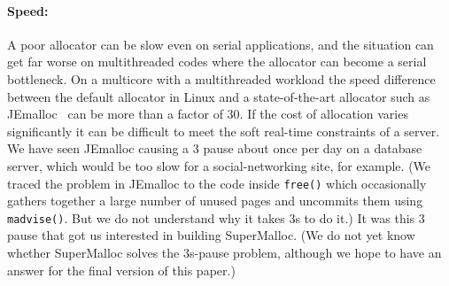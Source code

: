\documentclass[pldi]{sigplanconf-pldi15}
\newcommand{\code}[1]{\texttt{#1}}
\begin{document}
{\paragraph{Speed:}} A poor allocator can be slow even on serial
applications, and the situation can get far worse on multithreaded
codes where the allocator can become a serial bottleneck.  On a
multicore with a multithreaded workload the speed difference between
the default allocator in Linux \cite{Lea96} and a state-of-the-art
allocator such as JEmalloc~\cite{Evans06} can be more than a factor of
30.  If the cost of allocation varies significantly it can be
difficult to meet the soft real-time constraints of a server.  We have
seen JEmalloc causing a \unit{3}\second{} pause about once per day on
a database server, which would be too slow for a social-networking
site, for example. (We traced the problem in JEmalloc to the code
inside \code{free()} which occasionally gathers together a large
number of unused pages and uncommits them using \code{madvise()}.  But
we do not understand why it takes $3$s to do it.)  It was this
\unit{3}\second{} pause that got us interested in building
SuperMalloc.  (We do not yet know whether SuperMalloc solves the
3s-pause problem, although we hope to have an answer for the final
version of this paper.)
\end{document}
